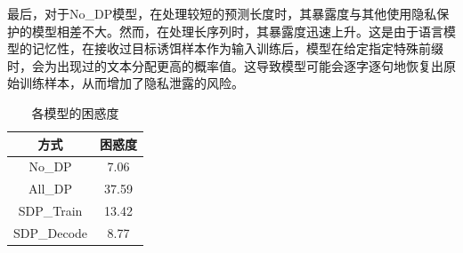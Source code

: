 最后，对于No\_DP模型，在处理较短的预测长度时，其暴露度与其他使用隐私保护的模型相差不大。然而，在处理长序列时，其暴露度迅速上升。这是由于语言模型的记忆性，在接收过目标诱饵样本作为输入训练后，模型在给定指定特殊前缀时，会为出现过的文本分配更高的概率值。这导致模型可能会逐字逐句地恢复出原始训练样本，从而增加了隐私泄露的风险。



\begin{table}[]
	\centering
	\caption{各模型的困惑度}
	\begin{tabular}{|c|c|}
		\hline
		方式&困惑度   \\ \hline
		No\_DP&7.06    \\ \hline
		All\_DP&37.59    \\ \hline
		SDP\_Train&13.42    \\ \hline
		SDP\_Decode&8.77   \\ \hline
	\end{tabular}
	\label{Chap5_Mode_PPL}
\end{table}

%

